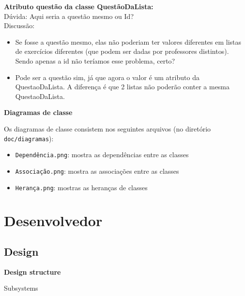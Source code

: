 \documentclass[12pt,letterpaper]{article}
\begin{document}
\textbf{Atributo questão da classe QuestãoDaLista:}\\
Dúvida: Aqui seria a questão mesmo ou Id?\\
\newline
Discussão:
\begin{itemize}
\item{}Se fosse a questão mesmo, elas não poderiam ter valores diferentes em listas de exercícios diferentes (que podem ser dadas por professores distintos). Sendo apenas a id não teríamos esse problema, certo?
\item{}Pode ser a questão sim, já que agora o valor é um atributo da QuestaoDaLista. A diferença é que 2 listas não poderão conter a mesma QuestaoDaLista.
\end{itemize}

\pagebreak

\vspace{1cm}
{\large {\bf Diagramas de classe}}
\vspace{0.5cm}

Os diagramas de classe consistem nos seguintes arquivos (no diretório \texttt{doc/diagramas}):

\begin{itemize}
\item{}\texttt{Dependência.png}: mostra as dependências entre as classes
\item{}\texttt{Associação.png}: mostra as associações entre as classes
\item{}\texttt{Herança.png}: mostras as heranças de classes
\end{itemize}


\pagebreak

\section{Desenvolvedor}

\subsection{Design}

\vspace{1cm}
{\large {\bf Design structure}}
\vspace{0.5cm}




Subsystems

\end{document}
